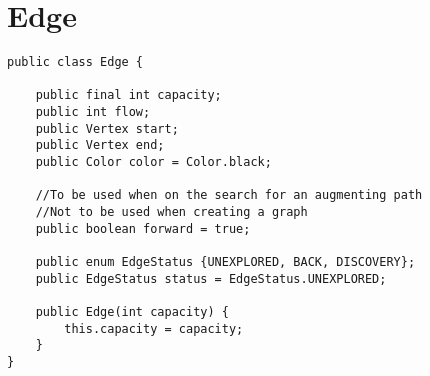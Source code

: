 \chapter{Edge}
\lstset{language=Java}
\begin{lstlisting}[caption=Edge Source Code]
public class Edge {

	public final int capacity;
	public int flow;
	public Vertex start;
	public Vertex end;
	public Color color = Color.black;
	
	//To be used when on the search for an augmenting path
	//Not to be used when creating a graph
	public boolean forward = true;
	
	public enum EdgeStatus {UNEXPLORED, BACK, DISCOVERY};
	public EdgeStatus status = EdgeStatus.UNEXPLORED;
	
	public Edge(int capacity) {
		this.capacity = capacity;
	}
}
\end{lstlisting}